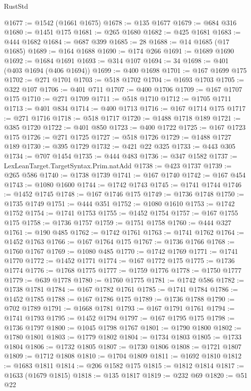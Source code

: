\begin{lexlean}{RustStd}
\begin{coremodule}
@1677 := @1542 (@1661 @1675)
@1678 := @135 @1677
@1679 := @684 @316
@1680 := @1451 @175
@1681 := @265 @1680
@1682 := @425 @1681
@1683 := @444 @1682
@1684 := @687 @399
@1685 := 28
@1688 := @14 @1685 (@17 @1685)
@1689 := @164 @1688
@1690 := @174 @266
@1691 := @1689 @1690
@1692 := @1684 @1691
@1693 := @314 @107
@1694 := 34
@1698 := @401 (@403 @1694 (@406 @1694))
@1699 := @400 @1698
@1701 := @167 @1699 @175
@1702 := @271 @1701
@1703 := @518 @1702
@1704 := @1693 @1703
@1705 := @322 @107
@1706 := @401 @711
@1707 := @400 @1706
@1709 := @167 @1707 @175
@1710 := @271 @1709
@1711 := @518 @1710
@1712 := @1705 @1711
@1713 := @401 @834
@1714 := @400 @1713
@1716 := @167 @1714 @175
@1717 := @271 @1716
@1718 := @518 @1717
@1720 := @1488 @1718 @189
@1721 := @385 @1720
@1722 := @401 @850
@1723 := @400 @1722
@1725 := @167 @1723 @175
@1726 := @271 @1725
@1727 := @518 @1726
@1729 := @1488 @1727 @189
@1730 := @395 @1729
@1732 := @421 @22 @325
@1733 := @443 @305
@1734 := @707 @1454
@1735 := @444 @483
@1736 := @347 @1582
@1737 := LexLeanTarget.TargetSyntax.Prim.natAdd
@1738 := @423 @1737
@1739 := @265 @586
@1740 := @1738 @1739
@1741 := @167 @1740
@1742 := @167 @454
@1743 := @1080 @1600
@1744 := @1742 @1743
@1745 := @1741 @1744
@1746 := @1452 @1745
@1748 := @167 @1746 @175
@1749 := @1736 @1748
@1750 := @1735 @1749
@1751 := @444 @351
@1752 := @1080 @1610
@1753 := @1742 @1752
@1754 := @1741 @1753
@1755 := @1452 @1754
@1757 := @167 @1755 @175
@1758 := @1736 @1757
@1759 := @1751 @1758
@1760 := @444 @327
@1761 := @190 @485
@1762 := @1742 @1761
@1763 := @1741 @1762
@1764 := @1452 @1763
@1766 := @167 @1764 @175
@1767 := @1736 @1766
@1768 := @1760 @1767
@1769 := @1080 @485
@1770 := @1742 @1769
@1771 := @1741 @1770
@1772 := @1452 @1771
@1774 := @167 @1772 @175
@1775 := @1736 @1774
@1776 := @1768 @1775
@1777 := @1759 @1776
@1778 := @1750 @1777
@1779 := @639 @1778
@1780 := @1760 @1775
@1781 := @1742 @586
@1782 := @1738 @1781
@1784 := @167 @1782 @1761
@1785 := @1741 @1784
@1786 := @1452 @1785
@1788 := @167 @1786 @175
@1789 := @1736 @1788
@1790 := @702 @1789
@1791 := @1668 @1781
@1793 := @167 @1791 @1761
@1794 := @1741 @1793
@1795 := @1452 @1794
@1797 := @167 @1795 @175
@1798 := @1736 @1797
@1800 := @1045 @1798 @1767
@1801 := @1790 @1800
@1802 := @1780 @1801
@1803 := @1779 @1802
@1804 := @1734 @1803
@1805 := @1733 @1804
@1806 := @1732 @1805
@1807 := @1730 @1806
@1808 := @1721 @1807
@1809 := @1712 @1808
@1810 := @1704 @1809
@1811 := @1692 @1810
@1812 := @1683 @1811
@1814 := @206 @1582 @175
@1815 := @1812 @1814
@1817 := @1633 (@1679 @1815)
@1818 := @135 @1817
@1819 := @232 @69
@1820 := @51 @22

\end{coremodule}
\end{lexlean}
